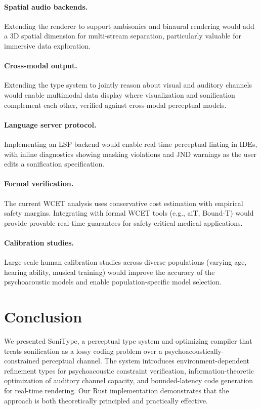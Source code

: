 \documentclass[sigchi, nonacm]{acmart}
\begin{document}
\paragraph{Spatial audio backends.} Extending the renderer to support ambisonics and binaural rendering would add a 3D spatial dimension for multi-stream separation, particularly valuable for immersive data exploration.

\paragraph{Cross-modal output.} Extending the type system to jointly reason about visual and auditory channels would enable multimodal data display where visualization and sonification complement each other, verified against cross-modal perceptual models.

\paragraph{Language server protocol.} Implementing an LSP backend would enable real-time perceptual linting in IDEs, with inline diagnostics showing masking violations and JND warnings as the user edits a sonification specification.

\paragraph{Formal verification.} The current WCET analysis uses conservative cost estimation with empirical safety margins. Integrating with formal WCET tools (e.g., aiT, Bound-T) would provide provable real-time guarantees for safety-critical medical applications.

\paragraph{Calibration studies.} Large-scale human calibration studies across diverse populations (varying age, hearing ability, musical training) would improve the accuracy of the psychoacoustic models and enable population-specific model selection.

\section{Conclusion}
\label{sec:conclusion}

We presented SoniType, a perceptual type system and optimizing compiler that treats sonification as a lossy coding problem over a psychoacoustically-constrained perceptual channel. The system introduces environment-dependent refinement types for psychoacoustic constraint verification, information-theoretic optimization of auditory channel capacity, and bounded-latency code generation for real-time rendering. Our Rust implementation demonstrates that the approach is both theoretically principled and practically effective.
\end{document}
